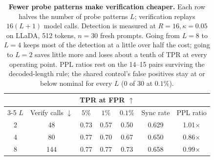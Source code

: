 \begin{table}[H]
\centering
\small
\renewcommand{\arraystretch}{0.85}
\begin{tabular}{ccccccc}
\toprule
& & \multicolumn{3}{c}{TPR at FPR $\uparrow$} & & \\
\cmidrule(lr){3-5}
$L$ & Verify calls $\downarrow$ & $5\%$ & $1\%$ & $0.1\%$ & Sync rate & PPL ratio \\
\midrule
2 & 48  & 0.73 & 0.57 & 0.50 & 0.629 & 1.01$\times$ \\
4 & 80  & 0.77 & 0.70 & 0.67 & 0.650 & 0.86$\times$ \\
8 & 144 & 0.77 & 0.77 & 0.73 & 0.658 & 0.99$\times$ \\
\bottomrule
\end{tabular}
\setlength{\abovecaptionskip}{3pt}
\caption{\textbf{Fewer probe patterns make verification cheaper.} Each row halves the
number of probe patterns $L$; verification replays $16(L+1)$ model calls. Detection is
measured at $R=16,\kappa=0.05$ on LLaDA, 512 tokens, $n=30$ fresh prompts. Going from
$L=8$ to $L=4$ keeps most of the detection at a little over half the cost; going to
$L=2$ saves little more and loses about a tenth of TPR at every operating point. PPL ratios
rest on the 14--15 pairs surviving the decoded-length rule; the shared control's false
positives stay at or below nominal for every $L$ ($0$ of $30$ at $0.1\%$).}
\label{tab:lsweep}
\end{table}
